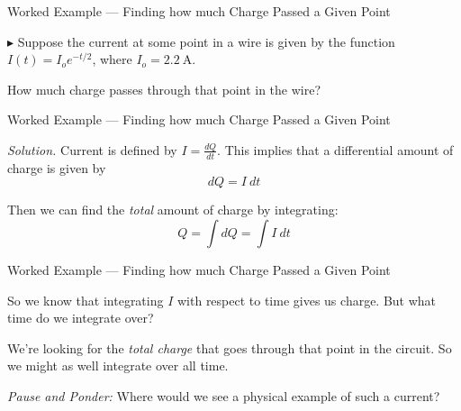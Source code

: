 \documentclass{beamer}
\begin{document}
\begin{frame}{Worked Example --- Finding how much Charge Passed a Given Point}

$\blacktriangleright$ Suppose the current at some point in a wire is given by the function $I(t) = I_o e^{-t/2}$, where $I_o = \SI{2.2}{\ampere}$.

\begin{figure}[H]
\centering
{}
\end{figure}

How much charge passes through that point in the wire?

\end{frame}

\begin{frame}{Worked Example --- Finding how much Charge Passed a Given Point}

\textit{Solution.} Current is defined by $I = \frac{dQ}{dt}$. This implies that a differential amount of charge is given by
\begin{equation*}
    dQ = I\ dt
\end{equation*}

Then we can find the \emph{total} amount of charge by integrating:
\begin{equation*}
    Q = \int dQ = \int I\ dt
\end{equation*}
    
\end{frame}

\begin{frame}{Worked Example --- Finding how much Charge Passed a Given Point}

So we know that integrating $I$ with respect to time gives us charge. But what time do we integrate over?

\vfill

We're looking for the \emph{total charge} that goes through that point in the circuit. So we might as well integrate over all time.

\vfill

\textit{Pause and Ponder:} Where would we see a physical example of such a current?

\end{frame}
\end{document}
